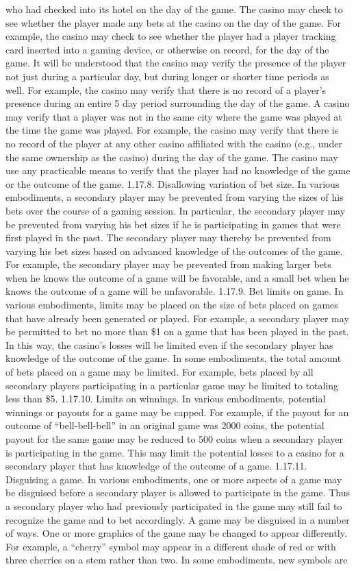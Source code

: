 \documentclass[11pt,a4paper]{article}
\begin{document}
who had checked into its hotel on the day of the game. The casino may check to see whether the player made any bets at the casino on the day of the game. For example, the casino may check to see whether the player had a player tracking card inserted into a gaming device, or otherwise on record, for the day of the game. It will be understood that the casino may verify the presence of the player not just during a particular day, but during longer or shorter time periods as well. For example, the casino may verify that there is no record of a player's presence during an entire 5 day period surrounding the day of the game. A casino may verify that a player was not in the same city where the game was played at the time the game was played. For example, the casino may verify that there is no record of the player at any other casino affiliated with the casino (e.g., under the same ownership as the casino) during the day of the game. The casino may use any practicable means to verify that the player had no knowledge of the game or the outcome of the game. 1.17.8. Disallowing variation of bet size. In various embodiments, a secondary player may be prevented from varying the sizes of his bets over the course of a gaming session. In particular, the secondary player may be prevented from varying his bet sizes if he is participating in games that were first played in the past. The secondary player may thereby be prevented from varying his bet sizes based on advanced knowledge of the outcomes of the game. For example, the secondary player may be prevented from making larger bets when he knows the outcome of a game will be favorable, and a small bet when he knows the outcome of a game will be unfavorable. 1.17.9. Bet limits on game. In various embodiments, limits may be placed on the size of bets placed on games that have already been generated or played. For example, a secondary player may be permitted to bet no more than \$1 on a game that has been played in the past. In this way, the casino's losses will be limited even if the secondary player has knowledge of the outcome of the game. In some embodiments, the total amount of bets placed on a game may be limited. For example, bets placed by all secondary players participating in a particular game may be limited to totaling less than \$5. 1.17.10. Limits on winnings. In various embodiments, potential winnings or payouts for a game may be capped. For example, if the payout for an outcome of “bell-bell-bell” in an original game was 2000 coins, the potential payout for the same game may be reduced to 500 coins when a secondary player is participating in the game. This may limit the potential losses to a casino for a secondary player that has knowledge of the outcome of a game. 1.17.11. Disguising a game. In various embodiments, one or more aspects of a game may be disguised before a secondary player is allowed to participate in the game. Thus a secondary player who had previously participated in the game may still fail to recognize the game and to bet accordingly. A game may be disguised in a number of ways. One or more graphics of the game may be changed to appear differently. For example, a “cherry” symbol may appear in a different shade of red or with three cherries on a stem rather than two. In some embodiments, new symbols are 
\end{document}
